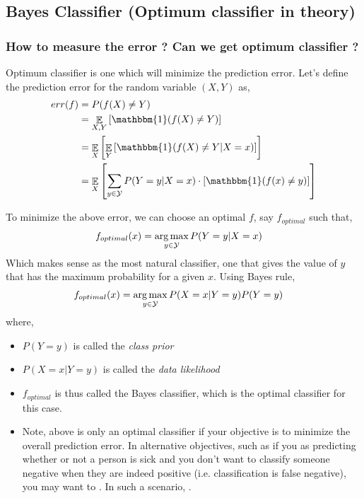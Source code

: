 \documentclass{article}
\begin{document}

\subsection{Bayes Classifier (Optimum classifier in theory)}

\subsubsection{How to measure the error ? Can we get optimum classifier ?}
Optimum classifier is one which will minimize the prediction error. Let's define the prediction error for the random variable $(X,Y)$ as,
\begin{align*}
    err(f) &= P(f(X) \neq Y)\\
    &= \E_{X,Y}\left[\mathbbm{1} (f(X) \neq Y) \right]\\
    &= \E_{X}\left[ \E_{Y} \left[ \mathbbm{1} (f(X) \neq Y \vert X=x) \right] \right]\\
    &= \E_{X}\left[ \sum_{y \in \mcaly} P(Y=y \vert X=x) \cdot \left [\mathbbm{1} (f(x) \neq y) \right] \right]\\
\end{align*}

To minimize the above error, we can choose an optimal $f$, say $f_{optimal}$ such that,
\begin{align*}
    f_{optimal}(x) &= \operatorname*{arg\,max}_{y \in \mathcal{Y}} P(Y = y \vert X = x)
\end{align*}
Which makes sense as the most natural classifier, one that gives the value of $y$ that has the maximum probability for a given $x$. Using Bayes rule,
\begin{align*}
    f_{optimal}(x) &= \operatorname*{arg\,max}_{y \in \mathcal{Y}} P(X = x | Y = y) P(Y = y)
\end{align*}
where,
\begin{itemize}
    \item $P(Y=y)$ is called the \textit{class prior}
    \item $P(X=x|Y=y)$ is called the \textit{data likelihood}
    \item $f_{optimal}$ is thus called the Bayes classifier, which is the optimal classifier for this case.
    \item Note, above is only an optimal classifier if your objective is to minimize the overall prediction error. In alternative objectives, such as if you as predicting whether or not a person is sick and you don't want to classify someone negative when they are indeed positive (i.e. classification is false negative), you may want to . In such a scenario, .
\end{itemize}
\end{document}
